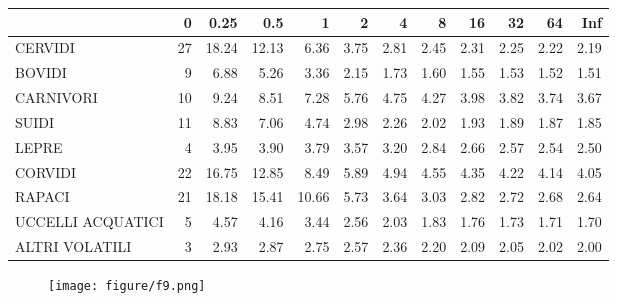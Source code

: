 \documentclass{article}
\begin{document}
\begin{table}[]
\centering
\begin{tabular}{l|r|r|r|r|r|r|r|r|r|r|r}
\hline
  & 0 & 0.25 & 0.5 & 1 & 2 & 4 & 8 & 16 & 32 & 64 & Inf\\
\hline
CERVIDI & 27 & 18.24 & 12.13 & 6.36 & 3.75 & 2.81 & 2.45 & 2.31 & 2.25 & 2.22 & 2.19\\
\hline
BOVIDI & 9 & 6.88 & 5.26 & 3.36 & 2.15 & 1.73 & 1.60 & 1.55 & 1.53 & 1.52 & 1.51\\
\hline
CARNIVORI & 10 & 9.24 & 8.51 & 7.28 & 5.76 & 4.75 & 4.27 & 3.98 & 3.82 & 3.74 & 3.67\\
\hline
SUIDI & 11 & 8.83 & 7.06 & 4.74 & 2.98 & 2.26 & 2.02 & 1.93 & 1.89 & 1.87 & 1.85\\
\hline
LEPRE & 4 & 3.95 & 3.90 & 3.79 & 3.57 & 3.20 & 2.84 & 2.66 & 2.57 & 2.54 & 2.50\\
\hline
CORVIDI & 22 & 16.75 & 12.85 & 8.49 & 5.89 & 4.94 & 4.55 & 4.35 & 4.22 & 4.14 & 4.05\\
\hline
RAPACI & 21 & 18.18 & 15.41 & 10.66 & 5.73 & 3.64 & 3.03 & 2.82 & 2.72 & 2.68 & 2.64\\
\hline
UCCELLI ACQUATICI & 5 & 4.57 & 4.16 & 3.44 & 2.56 & 2.03 & 1.83 & 1.76 & 1.73 & 1.71 & 1.70\\
\hline
ALTRI VOLATILI & 3 & 2.93 & 2.87 & 2.75 & 2.57 & 2.36 & 2.20 & 2.09 & 2.05 & 2.02 & 2.00\\
\hline
\end{tabular}
\end{table}

\begin{figure}[]
\texttt{[image: figure/f9.png]} \caption{}\label{fig:unnamed-chunk-1}
\end{figure}
\end{document}
